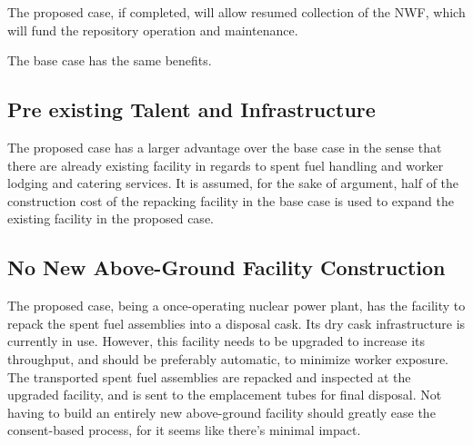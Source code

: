 The proposed case, if completed, will allow resumed collection of the \gls{NWF}, 
which will fund the repository operation and maintenance.

The base case has the same benefits.



\subsection{Pre existing Talent and Infrastructure }

%

The proposed case has a larger advantage over the base case in the sense that there
are already existing facility in regards to spent fuel handling and worker lodging 
and catering services. 
It is assumed, for the sake of argument, half of the construction cost of the
repacking facility in the base case is used to expand the existing facility in the
proposed case. 

\subsection{No New Above-Ground Facility Construction}



The proposed case, being a once-operating nuclear power plant, has the facility to 
repack the spent fuel assemblies into a disposal cask. Its dry cask infrastructure 
is currently in use. However, this facility needs to be upgraded to increase its throughput, and should be preferably automatic, to minimize worker exposure. The transported spent fuel assemblies are repacked and inspected at the upgraded facility, and is sent to the emplacement tubes for final disposal. Not having to build an entirely new above-ground facility should greatly ease the consent-based process, for it seems like there's minimal impact. 
 
